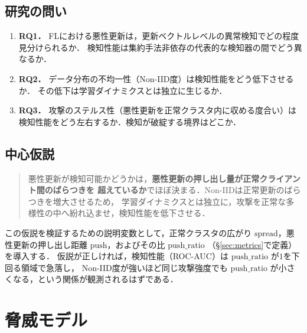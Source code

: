 \documentclass[a4j, dvipdfmx]{jsarticle}  %
\begin{document}
\subsection{研究の問い}

\begin{enumerate}
  \item \textbf{RQ1．} FLにおける悪性更新は，更新ベクトルレベルの異常検知でどの程度見分けられるか．
        検知性能は集約手法非依存の代表的な検知器の間でどう異なるか．
  \item \textbf{RQ2．} データ分布の不均一性（Non-IID度）は検知性能をどう低下させるか．
        その低下は学習ダイナミクスとは独立に生じるか．
  \item \textbf{RQ3．} 攻撃のステルス性（悪性更新を正常クラスタ内に収める度合い）は
        検知性能をどう左右するか．検知が破綻する境界はどこか．
\end{enumerate}

\subsection{中心仮説}

\begin{quote}
悪性更新が検知可能かどうかは，\textbf{悪性更新の押し出し量が正常クライアント間のばらつきを
超えているか}でほぼ決まる．Non-IIDは正常更新のばらつきを増大させるため，
学習ダイナミクスとは独立に，攻撃を正常な多様性の中へ紛れ込ませ，検知性能を低下させる．
\end{quote}

この仮説を検証するための説明変数として，正常クラスタの広がり
$\mathrm{spread}$，悪性更新の押し出し距離 $\mathrm{push}$，およびその比 $\mathrm{push\_ratio}$
（\S\ref{sec:metrics}で定義）を導入する．
仮説が正しければ，検知性能（ROC-AUC）は $\mathrm{push\_ratio}$ が$1$を下回る領域で急落し，
Non-IID度が強いほど同じ攻撃強度でも $\mathrm{push\_ratio}$ が小さくなる，という関係が観測されるはずである．

\section{脅威モデル}
\label{sec:threat}
\end{document}
